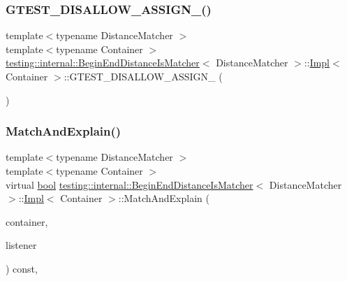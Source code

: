 \subsubsection{\texorpdfstring{G\+T\+E\+S\+T\+\_\+\+D\+I\+S\+A\+L\+L\+O\+W\+\_\+\+A\+S\+S\+I\+G\+N\+\_\+()}{GTEST\_DISALLOW\_ASSIGN\_()}}
{\footnotesize\ttfamily template$<$typename Distance\+Matcher $>$ \\
template$<$typename Container $>$ \\
\hyperlink{classtesting_1_1internal_1_1BeginEndDistanceIsMatcher}{testing\+::internal\+::\+Begin\+End\+Distance\+Is\+Matcher}$<$ Distance\+Matcher $>$\+::\hyperlink{classtesting_1_1internal_1_1BeginEndDistanceIsMatcher_1_1Impl}{Impl}$<$ Container $>$\+::G\+T\+E\+S\+T\+\_\+\+D\+I\+S\+A\+L\+L\+O\+W\+\_\+\+A\+S\+S\+I\+G\+N\+\_\+ (\begin{DoxyParamCaption}\item[{\hyperlink{classtesting_1_1internal_1_1BeginEndDistanceIsMatcher_1_1Impl}{Impl}$<$ Container $>$}]{ }\end{DoxyParamCaption})\hspace{0.3cm}{\ttfamily [private]}}

\mbox{\label{classtesting_1_1internal_1_1BeginEndDistanceIsMatcher_1_1Impl_aa7bda59eae256018247699b0baa285c9}} 
\subsubsection{\texorpdfstring{Match\+And\+Explain()}{MatchAndExplain()}}
{\footnotesize\ttfamily template$<$typename Distance\+Matcher $>$ \\
template$<$typename Container $>$ \\
virtual \hyperlink{classbool}{bool} \hyperlink{classtesting_1_1internal_1_1BeginEndDistanceIsMatcher}{testing\+::internal\+::\+Begin\+End\+Distance\+Is\+Matcher}$<$ Distance\+Matcher $>$\+::\hyperlink{classtesting_1_1internal_1_1BeginEndDistanceIsMatcher_1_1Impl}{Impl}$<$ Container $>$\+::Match\+And\+Explain (\begin{DoxyParamCaption}\item[{Container}]{container,  }\item[{\hyperlink{classtesting_1_1MatchResultListener}{Match\+Result\+Listener} $\ast$}]{listener }\end{DoxyParamCaption}) const\hspace{0.3cm}{\ttfamily [inline]}, {\ttfamily [virtual]}}



